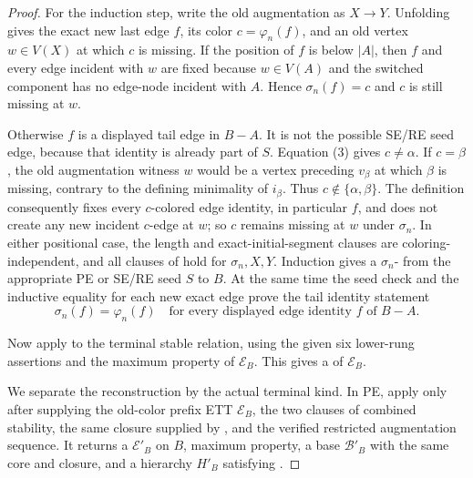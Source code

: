 \begin{proof}
For the induction step, write the old augmentation as $X\longrightarrow Y$.
Unfolding  gives the exact new last edge
$f$, its color $c=\varphi_n(f)$, and an old vertex $w\in V(X)$ at which
$c$ is missing.  If the position of $f$ is below $|A|$, then $f$ and
every edge incident with $w$ are fixed because $w\in V(A)$ and the
switched component has no edge-node incident with $A$.  Hence
$\sigma_n(f)=c$ and $c$ is still missing at $w$.

Otherwise $f$ is a displayed tail edge in $B-A$.  It is not the possible
SE/RE seed edge, because that identity is already part of $S$.  Equation
(3) gives $c\ne\alpha$.  If $c=\beta$, the old augmentation witness $w$
would be a vertex preceding $v_\beta$ at which $\beta$ is missing,
contrary to the defining minimality of $i_\beta$.  Thus
$c\notin\{\alpha,\beta\}$.  The definition
 consequently fixes every $c$-colored
edge identity, in particular $f$, and does not create any new incident
$c$-edge at $w$; so $c$ remains missing at $w$ under $\sigma_n$.
In either positional case, the length and exact-initial-segment clauses
are coloring-independent, and all clauses of
 hold for $\sigma_n,X,Y$.  Induction gives
a $\sigma_n$- from the appropriate
PE or SE/RE seed $S$ to $B$.  At the same time the seed check and the
inductive equality for each new exact edge prove the tail identity
statement
\[
 \sigma_n(f)=\varphi_n(f)
 \quad\text{for every displayed edge identity }f\text{ of }B-A. \tag{4}
\]

Now apply  to the terminal stable relation, using the given
six lower-rung assertions and the maximum property of $\mathcal E_B$.
This gives a  of $\mathcal E_B$.

We separate the reconstruction by the actual terminal kind.  In PE,
apply  only after supplying the old-color
prefix ETT $\mathcal E_B$, the two clauses of combined stability, the
same closure supplied by , and
the verified restricted augmentation sequence.  It returns a
 $\mathcal E'_B$ on $B$,
maximum property, a base $\mathcal B'_B$ with the same core and closure,
and a hierarchy $H'_B$ satisfying .


\end{proof}
